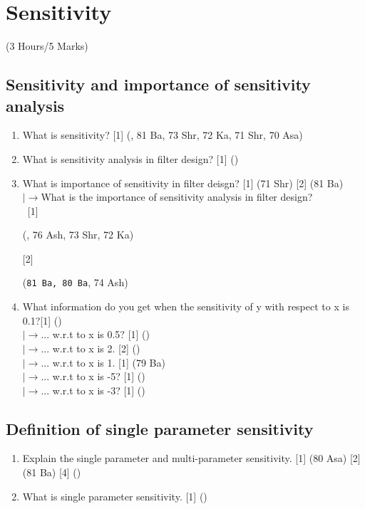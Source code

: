 \documentclass[12pt]{article}
\newcommand{\lb}{\\$\left|\rightarrow\right.$}
\newcommand{\enter}{\\\textcolor{white}{1}}
\begin{document}
	\pagebreak

\section{Sensitivity}
	\begin{center}(3 Hours/5 Marks)\end{center}
	\subsection{Sensitivity and importance of sensitivity analysis}
		\begin{enumerate}
			\item What is sensitivity? \hfill [1] {\footnotesize (, 81 Ba, 73 Shr, 72 Ka, 71 Shr, 70 Asa)}

			\item What is sensitivity analysis in filter design? \hfill [1] ()
			
			\item What is importance of sensitivity in filter deisgn? \hfill [1] (71 Shr) [2] (81 Ba)
			\lb What is the importance of sensitivity analysis in filter design?
			\enter\hfill [1] \begin{footnotesize} (, 76 Ash, 73 Shr, 72 Ka) \end{footnotesize} [2] \begin{footnotesize} (\texttt{81 Ba, 80 Ba}, 74 Ash) \end{footnotesize}

			\item What information do you get when the sensitivity of y with respect to x is 0.1?\hfill [1] ()
			\lb ... w.r.t to x is 0.5? \hfill [1] ()
			\lb ... w.r.t to x is 2. \hfill [2] ()
			\lb ... w.r.t to x is 1. \hfill [1] (79 Ba)
			\lb ... w.r.t to x is -5? \hfill [1] ()
			\lb ... w.r.t to x is -3? \hfill [1] ()
		\end{enumerate}

	\subsection{Definition of single parameter sensitivity}
		\begin{enumerate}[noitemsep, topsep=0pt]
			\item Explain the single parameter and multi-parameter sensitivity. \hfill [1] (80 Asa) [2] (81 Ba) [4] ()

			\item What is single parameter sensitivity. \hfill [1] ()
		\end{enumerate}
\end{document}
